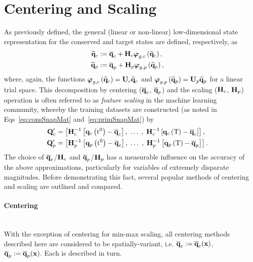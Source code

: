 \section{Centering and Scaling}\label{sec:centerScale}
%
As previously defined, the general (linear or non-linear) low-dimensional state representation for the conserved and target states are defined, respectively, as
%
\begin{align}
	\consVecRom &\defEq \consVecCent + \consScale \nnLayer_{\decoderVar,\consVar}\left(\consVecCoef\right), \\
	\primVecRom &\defEq \primVecCent + \primScale \nnLayer_{\decoderVar,\primVar} \left(\primVecCoef\right),
\end{align}
%
where, again, the functions $\nnLayer_{\decoderVar,\consVar}\left(\consVecCoef\right) = \consTrial \consVecCoef$ and $\nnLayer_{\decoderVar,\primVar}\left(\primVecCoef\right) = \primTrial \primVecCoef$ for a linear trial space. This decomposition by centering ($\mathbf{\overline{q}}_{c}$, $\mathbf{\overline{q}}_{p}$) and the scaling ($\consScale$, $\primScale$) operation is often referred to as \textit{feature scaling} in the machine learning community, whereby the training datasets are constructed (as noted in Eqs~\ref{eq:consSnapMat} and~\ref{eq:primSnapMat}) by
%
\begin{align}
	\consDataMatUns &= \left[ \consScaleInv\left[\consFunc{\initTime} - \consVecCent\right], \; \hdots \; , \; \consScaleInv\left[\consFunc{\finalTime} - \consVecCent \right] \right], \\
	\primDataMatUns &= \left[ \primScaleInv\left[\primFunc{\initTime} - \consVecCent\right], \; \hdots \; , \; \primScaleInv\left[\primFunc{\finalTime} - \primVecCent \right] \right].
\end{align}
%
The choice of $\mathbf{\overline{q}}_{c}$/$\consScale$ and $\mathbf{\overline{q}}_{p}$/$\primScale$ has a measurable influence on the accuracy of the above approximations, particularly for variables of extremely disparate magnitudes. Before demonstrating this fact, several popular methods of centering and scaling are outlined and compared.

\paragraph*{Centering}\mbox{}\\
%
With the exception of centering for min-max scaling, all centering methods described here are considered to be spatially-variant, i.e. $\mathbf{\overline{q}}_{c} := \mathbf{\overline{q}}_{c}(\mathbf{x})$, $\mathbf{\overline{q}}_{p} := \mathbf{\overline{q}}_{p}(\mathbf{x})$. Each is described in turn.

